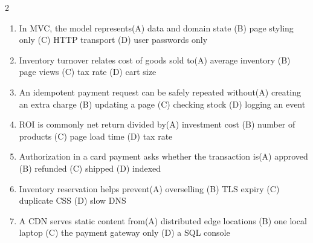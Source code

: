 \documentclass[a4paper]{article}
\begin{document}
\begin{multicols*}{2}
\begin{enumerate}[resume]
\item In MVC, the model represents\newline\hspace*{0.6em}(A) data and domain state \quad (B) page styling only \newline\hspace*{0.6em}(C) HTTP transport \quad (D) user passwords only
\item Inventory turnover relates cost of goods sold to\newline\hspace*{0.6em}(A) average inventory \quad (B) page views \newline\hspace*{0.6em}(C) tax rate \quad (D) cart size
\item An idempotent payment request can be safely repeated without\newline\hspace*{0.6em}(A) creating an extra charge \quad (B) updating a page \newline\hspace*{0.6em}(C) checking stock \quad (D) logging an event
\item ROI is commonly net return divided by\newline\hspace*{0.6em}(A) investment cost \quad (B) number of products \newline\hspace*{0.6em}(C) page load time \quad (D) tax rate
\item Authorization in a card payment asks whether the transaction is\newline\hspace*{0.6em}(A) approved \quad (B) refunded \newline\hspace*{0.6em}(C) shipped \quad (D) indexed
\item Inventory reservation helps prevent\newline\hspace*{0.6em}(A) overselling \quad (B) TLS expiry \newline\hspace*{0.6em}(C) duplicate CSS \quad (D) slow DNS
\item A CDN serves static content from\newline\hspace*{0.6em}(A) distributed edge locations \quad (B) one local laptop \newline\hspace*{0.6em}(C) the payment gateway only \quad (D) a SQL console

\end{enumerate}
\end{multicols*}
\end{document}

